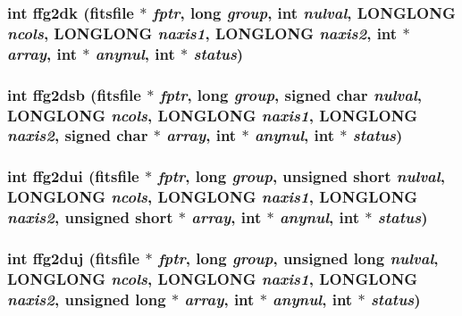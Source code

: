 \subsubsection{\setlength{\rightskip}{0pt plus 5cm}int ffg2dk (\bf{fitsfile} $\ast$ {\em fptr}, long {\em group}, int {\em nulval}, \bf{LONGLONG} {\em ncols}, \bf{LONGLONG} {\em naxis1}, \bf{LONGLONG} {\em naxis2}, int $\ast$ {\em array}, int $\ast$ {\em anynul}, int $\ast$ {\em status})}\label{src_2fitsio_8h_0e3f7de04e6af68b251804ffc843c800}


\subsubsection{\setlength{\rightskip}{0pt plus 5cm}int ffg2dsb (\bf{fitsfile} $\ast$ {\em fptr}, long {\em group}, signed char {\em nulval}, \bf{LONGLONG} {\em ncols}, \bf{LONGLONG} {\em naxis1}, \bf{LONGLONG} {\em naxis2}, signed char $\ast$ {\em array}, int $\ast$ {\em anynul}, int $\ast$ {\em status})}\label{src_2fitsio_8h_7c7c41674f8eebae81c9a06454c600a8}


\subsubsection{\setlength{\rightskip}{0pt plus 5cm}int ffg2dui (\bf{fitsfile} $\ast$ {\em fptr}, long {\em group}, unsigned short {\em nulval}, \bf{LONGLONG} {\em ncols}, \bf{LONGLONG} {\em naxis1}, \bf{LONGLONG} {\em naxis2}, unsigned short $\ast$ {\em array}, int $\ast$ {\em anynul}, int $\ast$ {\em status})}\label{src_2fitsio_8h_71805ed6df59798823e27f9e54376304}


\subsubsection{\setlength{\rightskip}{0pt plus 5cm}int ffg2duj (\bf{fitsfile} $\ast$ {\em fptr}, long {\em group}, unsigned long {\em nulval}, \bf{LONGLONG} {\em ncols}, \bf{LONGLONG} {\em naxis1}, \bf{LONGLONG} {\em naxis2}, unsigned long $\ast$ {\em array}, int $\ast$ {\em anynul}, int $\ast$ {\em status})}\label{src_2fitsio_8h_3c7c26f18620aa474bccee38bd2bfac0}


